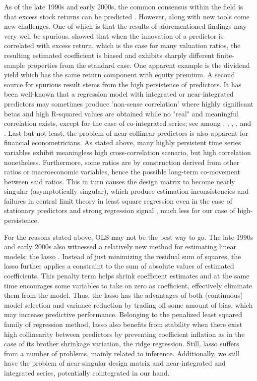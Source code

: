 \documentclass[12pt,a4paper]{article}
\begin{document}
As of the late 1990s and early 2000s, the common consensus within the field is that excess stock returns can be predicted \citep{welch2008comprehensive}. However, along with new tools come new challenges. One of which is that the results of aforementioned findings may very well be spurious. \citep{stambaugh1999predictive} showed that when the innovation of a predictor is correlated with excess return, which is the case for many valuation ratios, the resulting estimated coefficient is biased and exhibits sharply different finite-sample properties from the standard case. One apparent example is the dividend yield which has the same return component with equity premium. A second source for spurious result stems from the high persistence of predictors. It has been well-known that a regression model with integrated or near-integrated predictors may sometimes produce 'non-sense correlation' where highly significant betas and high R-squared values are obtained while no "real" and meaningful correlation exists, except for the case of co-integrated series; see among \cite{yule1926we}, \cite{granger1974spurious}, \cite{phillips1986understanding}, \cite{granger2001spurious}, and \cite{engle1987co}. Last but not least, the problem of near-collinear predictors is also apparent for financial econometricians. As stated above, many highly persistent time series variables exhibit meaningless high cross-correlation scenario, but high correlation nonetheless. Furthermore, some ratios are by construction derived from other ratios or macroeconomic variables, hence the possible long-term co-movement between said ratios. This in turn causes the design matrix to become nearly singular (asymptotically singular), which produce estimation inconsistencies and failures in central limit theory in least square regression even in the case of stationary predictors and strong regression signal \citep{phillips2016inference}, much less for our case of high-persistence.

For the reasons stated above, OLS may not be the best way to go. The late 1990s and early 2000s also witnessed a relatively new method for estimating linear models: the lasso \citep{tibshirani1996regression}. Instead of just minimizing the residual sum of squares, the lasso further applies a constraint to the sum of absolute values of estimated coefficients. This penalty term helps shrink coefficient estimates and at the same time encourages some variables to take on zero as coefficient, effectively eliminate them from the model. Thus, the lasso has the advantages of both (continuous) model selection and variance reduction by trading off some amount of bias, which may increase predictive performance. Belonging to the penalized least squared family of regression method, lasso also benefits from stability when there exist high collinearity between predictors by preventing coefficient inflation as in the case of its brother shrinkage variation, the ridge regression. Still, lasso suffers from a number of problems, mainly related to inference. Additionally, we still have the problem of near-singular design matrix and near-integrated and integrated series, potentially cointegrated in our hand.
\end{document}
